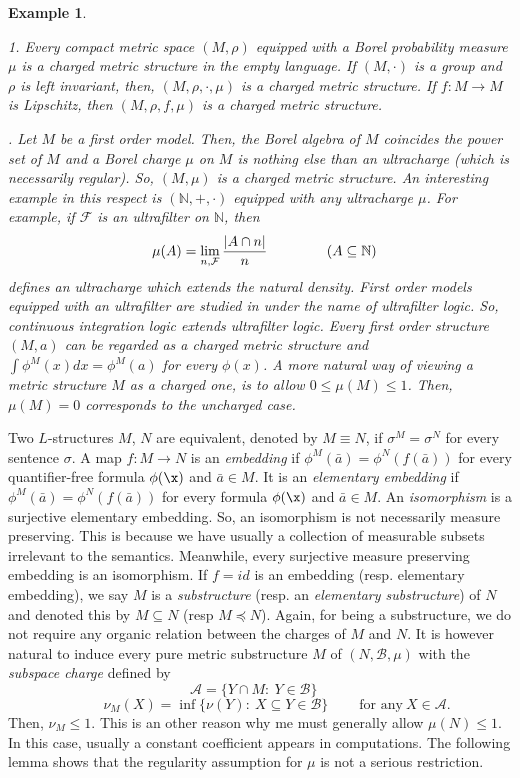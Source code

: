 \documentclass[12pt]{article}
\newtheorem{example}[theorem]{Example}
\def\a{\bar {a}}\def\b{\bar {b}}\def\c{\bar {c}}
\def\Nn{\mathbb N}
\begin{document}
\begin{example}
\em{1. Every compact metric space $(M,\rho)$ equipped with a Borel probability measure $\mu$
is a charged metric structure in the empty language.
If $(M,\cdot)$ is a group and $\rho$ is left invariant, then, $(M,\rho,\cdot,\mu)$ is a
charged metric structure. If $f:M\rightarrow M$ is Lipschitz, then $(M,\rho,f,\mu)$ is a charged metric structure.
\vspace{2mm}

. Let $M$ be a first order model. Then, the Borel algebra of $M$ coincides the power set
of $M$ and a Borel charge $\mu$ on $M$ is nothing else than an ultracharge (which is necessarily regular).
So, $(M,\mu)$ is a charged metric structure.
An interesting example in this respect is $(\Nn,+,\cdot)$ equipped with any ultracharge $\mu$.
For example, if $\mathcal F$ is an ultrafilter on $\Nn$, then
$$\ \ \mu(A)=\lim_{n,\mathcal F}\frac{|A\cap n|}{n}\hspace{15mm} (A\subseteq\Nn)$$
defines an ultracharge which extends the natural density.
First order models equipped with an ultrafilter are studied in \cite{Veloso} under the name of \emph{ultrafilter logic}.
So, continuous integration logic extends ultrafilter logic.
Every first order structure $(M,a)$ can be regarded as a charged metric structure and
$\int\phi^M(x)dx=\phi^M(a)$ for every $\phi(x)$.
A more natural way of viewing a metric structure $M$ as a charged one, is to allow $0\leqslant\mu(M)\leqslant1$.
Then, $\mu(M)=0$ corresponds to the uncharged case.}
\end{example}

Two $L$-structures $M$, $N$ are equivalent, denoted by $M\equiv N$, if $\sigma^M=\sigma^N$ for every sentence $\sigma$.
A map $f:M\rightarrow N$ is an \emph{embedding} if $\phi^M(\a)=\phi^N(f(\a))$ for every quantifier-free formula $\phi(\x)$ and $\a\in M$.
It is an \emph{elementary embedding} if $\phi^M(\a)=\phi^N(f(\a))$ for every formula $\phi(\x)$ and $\a\in M$.
An \emph{isomorphism} is a surjective elementary embedding. So, an isomorphism is not necessarily measure preserving.
This is because we have usually a collection of measurable subsets irrelevant to the semantics.
Meanwhile, every surjective measure preserving embedding is an isomorphism. %
If $f=id$ is an embedding (resp. elementary embedding), we say $M$ is a \emph{substructure}
(resp. an \emph{elementary substructure}) of $N$ and denoted this by $M\subseteq N$ (resp $M\preccurlyeq N$).
Again, for being a substructure, we do not require any organic relation between the charges of $M$ and $N$.
It is however natural to induce every pure metric substructure $M$ of $(N,\mathcal{B},\mu)$
with the \emph{subspace charge} defined by
$$\mathcal A=\{Y\cap M:\ Y\in\mathcal B\}\ \ \ \ $$
$$\ \ \ \ \ \ \ \ \ \ \ \nu_M(X)=\inf\{\nu(Y):\ X\subseteq Y\in\mathcal{B}\}\ \ \ \ \ \ \ \ \ \ \mbox{for\ any}\ X\in\mathcal A.$$
Then, $\nu_M\leqslant1$. This is an other reason why me must generally allow $\mu(N)\leqslant1$.
In this case, usually a constant coefficient appears in computations.
The following lemma shows that the regularity assumption for $\mu$ is not a serious restriction.
\end{document}
